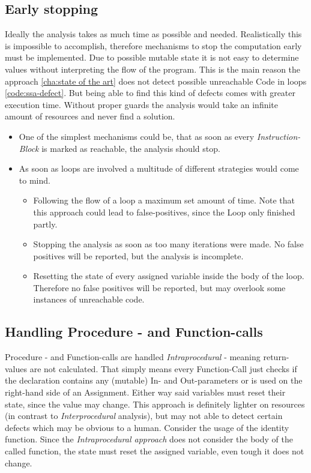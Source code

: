\subsection{Early stopping}
\label{sub:early stopping}
Ideally the analysis takes as much time as possible and needed. Realistically this is impossible to accomplish, therefore mechanisms to stop the computation early must be implemented.
Due to possible mutable state it is not easy to determine values without interpreting the flow of the program. This is the main reason the approach \ref{cha:state of the art} does not detect possible unreachable Code in loops \ref{code:ssa-defect}. 
But being able to find this kind of defects comes with greater execution time. Without proper guards the analysis would take an infinite amount of resources and never find a solution.
\begin{itemize}
	\item One of the simplest mechanisms could be, that as soon as every \emph{Instruction-Block} is marked as reachable, the analysis should stop.
	\item As soon as loops are involved a multitude of different strategies would come to mind. 
	\begin{itemize}
		\item Following the flow of a loop a maximum set amount of time. Note that this approach could lead to false-positives, since the Loop only finished partly. 
		\item Stopping the analysis as soon as too many iterations were made. No false positives will be reported, but the analysis is incomplete.
		\item Resetting the state of every assigned variable inside the body of the loop. Therefore no false positives will be reported, but may overlook some instances of unreachable code.
	\end{itemize}
\end{itemize}

\subsection{Handling Procedure - and Function-calls}
\label{sub:handling procedure and function calls}
Procedure - and Function-calls are handled \emph{Intraprocedural} - meaning return-values are not calculated. That simply means every Function-Call just checks if the declaration contains any (mutable) In- and Out-parameters or is used on the right-hand side of an Assignment.
Either way said variables must reset their state, since the value may change. 
This approach is definitely lighter on resources (in contrast to \emph{Interprocedural} analysis), but may not able to detect certain defects which may be obvious to a human. Consider the usage of the identity function. Since the \emph{Intraprocedural approach} does not consider the body of the called function, the state must reset the assigned variable, even tough it does not change.

